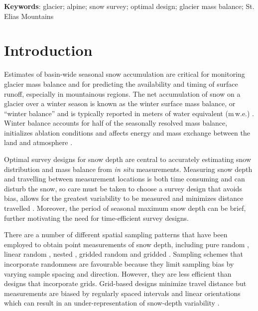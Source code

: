 \documentclass{article}
\begin{document}
\vspace{0.3cm} 
\textbf{Keywords}: glacier; alpine; snow survey; optimal design; glacier mass balance; St. Elias Mountains


\section{Introduction}

Estimates of basin-wide seasonal snow accumulation are critical for monitoring glacier mass balance and for predicting the availability and timing of surface runoff, especially in mountainous regions. The net accumulation of snow on a glacier over a winter season is known as the winter surface mass balance, or ``winter balance'' and is typically reported in meters of water equivalent (m\,w.e.) \citep{Cogley2011}. Winter balance accounts for half of the seasonally resolved mass balance, initializes ablation conditions and affects energy and mass exchange between the land and atmosphere \citep[e.g.][]{Hock2005, Reveillet2016}. 

Optimal survey designs for snow depth are central to accurately estimating snow distribution and mass balance from \textit{in situ} measurements. Measuring snow depth and travelling between measurement locations is both time consuming and can disturb the snow, so care must be taken to choose a survey design that avoids bias, allows for the greatest variability to be measured and minimizes distance travelled \citep[e.g.][]{Shea2010,Kinar2015}. Moreover, the period of seasonal maximum snow depth can be brief, further motivating the need for time-efficient survey designs. 

There are a number of different spatial sampling patterns that have been employed to obtain point measurements of snow depth, including pure random \citep[e.g.][]{Elder1991}, linear random \cite[e.g.][]{Shea2010}, nested \citep[e.g.][]{Schweizer2008}, gridded random \citep[e.g.][]{Bellaire2008, Elder2009, Bellaire2011} and gridded \citep[e.g.][]{Molotch2005a, Kronholm2007, Lopez2011}. Sampling schemes that incorporate randomness are favourable because they limit sampling bias by varying sample spacing and direction. However, they are less efficient than designs that incorporate grids. Grid-based designs minimize travel distance but measurements are biased by regularly spaced intervals and linear orientations which can result in an under-representation of  snow-depth variability \citep{Kronholm2007}.
\end{document}
